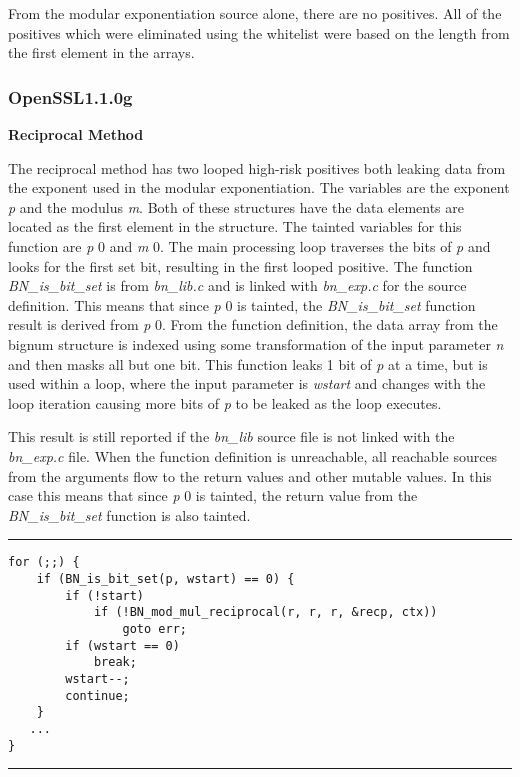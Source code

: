 \documentclass[11pt,a4paper]{article}
\newcommand{\codevar}[1]{\textit{#1}}
\newcommand{\codefn}[1]{\textit{#1}}
\newcommand{\codefile}[1]{\textit{#1}}
\newcommand{\ruleabove}{\vspace{5pt}\hrule}
\newcommand{\rulebelow}{\hrule\vspace{5pt}}
\begin{document}
  From the modular exponentiation source alone, there are no positives. All of
  the positives which were eliminated using the whitelist were based on the
  length from the first element in the arrays.

\subsubsection{OpenSSL1.1.0g}

\noindent
\textbf{Reciprocal Method}

   The reciprocal method has two looped high-risk positives both leaking data
   from the exponent used in the modular exponentiation. The variables are the
   exponent \codevar{p} and the modulus \codevar{m}. Both of these structures have the data
   elements are located as the first element in the structure. The tainted
   variables for this function are \codevar{p} 0 and \codevar{m} 0. The main processing loop
   traverses the bits of \codevar{p} and looks for the first set bit, resulting in the
   first looped positive. The function \codefn{BN\_is\_bit\_set} is from  \codefile{bn\_lib.c} and is
   linked with \codefile{bn\_exp.c} for the source definition. This means that since \codevar{p} 0
   is tainted, the \codefn{BN\_is\_bit\_set} function result is derived from \codevar{p} 0. From
   the function definition, the data array from the bignum structure is indexed
   using some transformation of the input parameter \codevar{n} and then masks all but
   one bit. This function leaks 1 bit of \codevar{p} at a time, but is used within a
   loop, where the input parameter is \codevar{wstart} and changes with the loop
   iteration causing more bits of \codevar{p} to be leaked as the loop executes.
   
   This result is still reported if the \codefile{bn\_lib} source file is not linked with
   the \codefile{bn\_exp.c} file. When the function definition is unreachable, all reachable
   sources from the arguments flow to the return values and other mutable
   values. In this case this means that since \codevar{p} 0 is tainted, the return value
   from the \codefn{BN\_is\_bit\_set} function is also tainted.

\ruleabove
\begin{lstlisting}[caption=OpenSSL 1.1.0g - bn\_exp.c lines 250 - 259]
for (;;) {
    if (BN_is_bit_set(p, wstart) == 0) {
        if (!start)
            if (!BN_mod_mul_reciprocal(r, r, r, &recp, ctx))
                goto err;
        if (wstart == 0)
            break;
        wstart--;
        continue;
    }
   ...
}
\end{lstlisting}
\rulebelow
\end{document}
